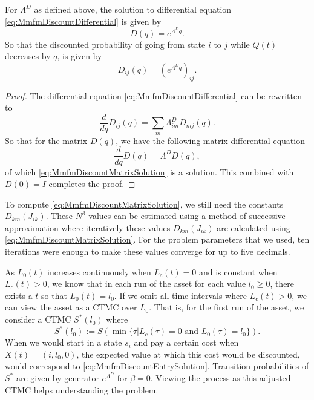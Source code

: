 \begin{theorem}
	For $\Lambda^D$ as defined above, the solution to differential equation \eqref{eq:MmfmDiscountDifferential} is given by
	\begin{equation}\label{eq:MmfmDiscountMatrixSolution}
	D(q)=e^{\Lambda^D q}.
	\end{equation}
	So that the discounted probability of going from state $i$ to $j$ while $Q(t)$ decreases by $q$, is given by
	\begin{equation}\label{eq:MmfmDiscountEntrySolution}
	D_{ij}(q)=\left(e^{\Lambda^D q}\right)_{ij}.
	\end{equation}
	\begin{proof}
		The differential equation \eqref{eq:MmfmDiscountDifferential} can be rewritten to
		\[
			\frac{d}{dq}D_{ij}(q)=\sum\limits_m\Lambda^D_{im}D_{mj}(q).
		\]
		So that for the matrix $D(q)$, we have the following matrix differential equation
		\[
		\frac{d}{dq}D(q)=\Lambda^D D(q),
		\]
		of which \eqref{eq:MmfmDiscountMatrixSolution} is a solution.
		This combined with $D(0)=I$ completes the proof.
	\end{proof}
\end{theorem}

\begin{remark}
	To compute \eqref{eq:MmfmDiscountMatrixSolution}, we still need the constants $D_{km}(J_{ik})$.
	These $N^3$ values can be estimated using a method of successive approximation where iteratively these values $D_{km}(J_{ik})$ are calculated using \eqref{eq:MmfmDiscountMatrixSolution}.
	For the problem parameters that we used, ten iterations were enough to make these values converge for up to five decimals.
\end{remark}

\begin{remark}\label{remark:MmfmStochasticShortestPath}
	As $L_0(t)$ increases continuously when $L_c(t)=0$ and is constant when $L_c(t)>0$, we know that in each run of the asset for each value $l_0\geq0$, there exists a $t$ so that $L_0(t)=l_0$.
	If we omit all time intervals where $L_c(t)>0$, we can view the asset as a CTMC over $L_0$.
	That is, for the first run of the asset, we consider a CTMC $S^*(l_0)$ where
	\[
	S^*(l_0):=S(\min\{\tau|L_c(\tau)=0\text{ and } L_0(\tau)=l_0\}).
	\]
	When we would start in a state $s_i$ and pay a certain cost when $X(t)=(i,l_0,0)$, the expected value at which this cost would be discounted, would correspond to \eqref{eq:MmfmDiscountEntrySolution}.
	Transition probabilities of $S^*$ are given by generator $e^{\Lambda^D}$ for $\beta=0$.
	Viewing the process as this adjusted CTMC helps understanding the problem.
\end{remark}

